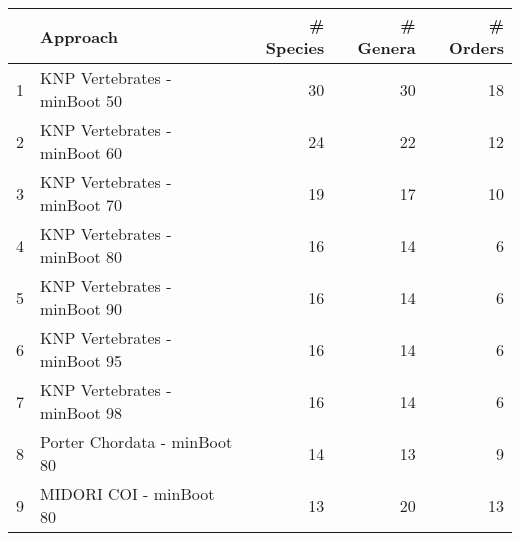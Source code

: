 \begin{table}[ht]
\centering
\begin{tabular}{rlrrr}
  \hline
 & Approach & \# Species & \# Genera & \# Orders \\ 
  \hline
1 & KNP Vertebrates - minBoot 50 & 30 & 30 & 18 \\ 
  2 & KNP Vertebrates - minBoot 60 & 24 & 22 & 12 \\ 
  3 & KNP Vertebrates - minBoot 70 & 19 & 17 & 10 \\ 
  4 & KNP Vertebrates - minBoot 80 & 16 & 14 & 6 \\ 
  5 & KNP Vertebrates - minBoot 90 & 16 & 14 & 6 \\ 
  6 & KNP Vertebrates - minBoot 95 & 16 & 14 & 6 \\ 
  7 & KNP Vertebrates - minBoot 98 & 16 & 14 & 6 \\ 
  8 & Porter Chordata - minBoot 80 & 14 & 13 & 9 \\ 
  9 & MIDORI COI - minBoot 80 & 13 & 20 & 13 \\ 
   \hline
\end{tabular}
\end{table}
